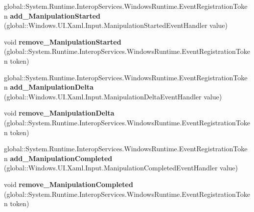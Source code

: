 \begin{DoxyCompactItemize}
global\+::\+System.\+Runtime.\+Interop\+Services.\+Windows\+Runtime.\+Event\+Registration\+Token {\bfseries add\+\_\+\+Manipulation\+Started} (global\+::\+Windows.\+U\+I.\+Xaml.\+Input.\+Manipulation\+Started\+Event\+Handler value)
\item 
\mbox{\label{interface_windows_1_1_u_i_1_1_xaml_1_1_i_u_i_element_a474a76e685a8b1af9722e5560b7d4c12}} 
void {\bfseries remove\+\_\+\+Manipulation\+Started} (global\+::\+System.\+Runtime.\+Interop\+Services.\+Windows\+Runtime.\+Event\+Registration\+Token token)
\item 
\mbox{\label{interface_windows_1_1_u_i_1_1_xaml_1_1_i_u_i_element_a478e7f65d80dfe362a865349005a2475}} 
global\+::\+System.\+Runtime.\+Interop\+Services.\+Windows\+Runtime.\+Event\+Registration\+Token {\bfseries add\+\_\+\+Manipulation\+Delta} (global\+::\+Windows.\+U\+I.\+Xaml.\+Input.\+Manipulation\+Delta\+Event\+Handler value)
\item 
\mbox{\label{interface_windows_1_1_u_i_1_1_xaml_1_1_i_u_i_element_a6abde84051b66829e30ea77484453f4f}} 
void {\bfseries remove\+\_\+\+Manipulation\+Delta} (global\+::\+System.\+Runtime.\+Interop\+Services.\+Windows\+Runtime.\+Event\+Registration\+Token token)
\item 
\mbox{\label{interface_windows_1_1_u_i_1_1_xaml_1_1_i_u_i_element_a359638bee7a6419a6b037cbd2981ae94}} 
global\+::\+System.\+Runtime.\+Interop\+Services.\+Windows\+Runtime.\+Event\+Registration\+Token {\bfseries add\+\_\+\+Manipulation\+Completed} (global\+::\+Windows.\+U\+I.\+Xaml.\+Input.\+Manipulation\+Completed\+Event\+Handler value)
\item 
\mbox{\label{interface_windows_1_1_u_i_1_1_xaml_1_1_i_u_i_element_a2e0443d9216898f5abc1ba06ac3d0404}} 
void {\bfseries remove\+\_\+\+Manipulation\+Completed} (global\+::\+System.\+Runtime.\+Interop\+Services.\+Windows\+Runtime.\+Event\+Registration\+Token token)
\item 
\mbox{\label{interface_windows_1_1_u_i_1_1_xaml_1_1_i_u_i_element_aac9b9aec43687960735502a35820466d}} 

\end{DoxyCompactItemize}
